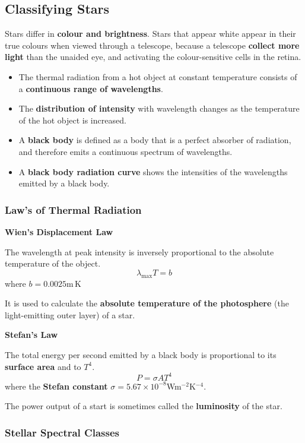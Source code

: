 \subsection{Classifying Stars}

Stars differ in \textbf{colour and brightness}. Stars that appear white appear in their true colours when viewed through a telescope, because a telescope \textbf{collect more light} than the unaided eye, and activating the colour-sensitive cells in the retina.
\begin{itemize}
    \item The thermal radiation from a hot object at constant temperature consists of a \textbf{continuous range of wavelengths}.
    \item The \textbf{distribution of intensity} with wavelength changes as the temperature of the hot object is increased.
    \item A \textbf{black body} is defined as a body that is a perfect absorber of radiation, and therefore emits a continuous spectrum of wavelengths.
    \item A \textbf{black body radiation curve} shows the intensities of the wavelengths emitted by a black body.
\end{itemize}

\subsubsection*{Law's of Thermal Radiation}

\textbf{Wien's Displacement Law}

The wavelength at peak intensity is inversely proportional to the absolute temperature of the object.
$$\lambda_\text{max}T=b$$
where $b=0.0025$m\,K

It is used to calculate the \textbf{absolute temperature of the photosphere} (the light-emitting outer layer) of a star.

\textbf{Stefan's Law}

The total energy per second emitted by a black body is proportional to its \textbf{surface area} and to $T^4$.
$$P=\sigma AT^4$$
where the \textbf{Stefan constant} $\sigma=5.67\times10^{-8}$Wm$^{-2}$K$^{-4}$.

The power output of a start is sometimes called the \textbf{luminosity} of the star.

\subsubsection*{Stellar Spectral Classes}

